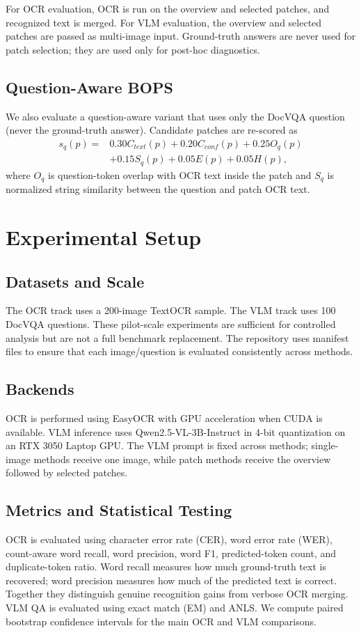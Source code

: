 \documentclass[conference]{IEEEtran}
\newcommand{\datasetocr}{TextOCR}
\newcommand{\datasetvlm}{DocVQA}
\begin{document}
For OCR evaluation, OCR is run on the overview and selected patches, and recognized text is merged. For VLM evaluation, the overview and selected patches are passed as multi-image input. Ground-truth answers are never used for patch selection; they are used only for post-hoc diagnostics.

\subsection{Question-Aware BOPS}
We also evaluate a question-aware variant that uses only the DocVQA question (never the ground-truth answer). Candidate patches are re-scored as
\begin{equation}
\begin{split}
    s_q(p) = {} & 0.30C_{text}(p) + 0.20C_{conf}(p) + 0.25O_q(p) \\
                & + 0.15S_q(p) + 0.05E(p) + 0.05H(p),
\end{split}
\end{equation}
where $O_q$ is question-token overlap with OCR text inside the patch and $S_q$ is normalized string similarity between the question and patch OCR text.

\section{Experimental Setup}
\subsection{Datasets and Scale}
The OCR track uses a 200-image \datasetocr{} sample. The VLM track uses 100 \datasetvlm{} questions. These pilot-scale experiments are sufficient for controlled analysis but are not a full benchmark replacement. The repository uses manifest files to ensure that each image/question is evaluated consistently across methods.

\subsection{Backends}
OCR is performed using EasyOCR with GPU acceleration when CUDA is available. VLM inference uses Qwen2.5-VL-3B-Instruct in 4-bit quantization on an RTX 3050 Laptop GPU. The VLM prompt is fixed across methods; single-image methods receive one image, while patch methods receive the overview followed by selected patches.

\subsection{Metrics and Statistical Testing}
OCR is evaluated using character error rate (CER), word error rate (WER), count-aware word recall, word precision, word F1, predicted-token count, and duplicate-token ratio. Word recall measures how much ground-truth text is recovered; word precision measures how much of the predicted text is correct. Together they distinguish genuine recognition gains from verbose OCR merging. VLM QA is evaluated using exact match (EM) and ANLS. We compute paired bootstrap confidence intervals for the main OCR and VLM comparisons.
\end{document}
